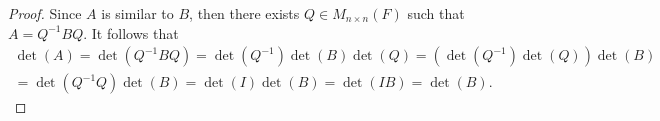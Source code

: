 \begin{Exercise}
\begin{proof}
Since $A$ is similar to $B$, then there exists $Q\in M_{n\times n}(F)$ such that $A = Q^{-1} B Q$. It follows that 
\begin{gather*}
\det(A) = \det(Q^{-1} B Q) = \det(Q^{-1})\det(B)\det(Q) = (\det(Q^{-1})\det(Q))\det(B) \\
= \det(Q^{-1}Q)\det(B) = \det(I)\det(B) = \det(I B) = \det(B).
\end{gather*}
\end{proof}
\end{Exercise}
